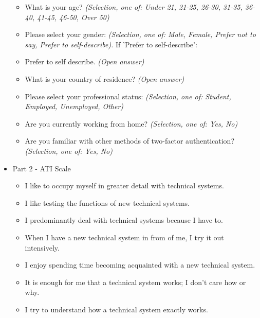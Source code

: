 \documentclass{l4proj}
\begin{document}
\begin{appendices}
\begin{itemize}
\begin{itemize}
        \item What is your age? \textit{(Selection, one of: Under 21, 21-25, 26-30, 31-35, 36-40, 41-45, 46-50, Over 50)}

        \item Please select your gender: \textit{(Selection, one of: Male, Female, Prefer not to say, Prefer to self-describe).} If 'Prefer to self-describe':

        \item Prefer to self describe. \textit{(Open answer)}

        \item What is your country of residence? \textit{(Open answer)}

        \item Please select your professional status: \textit{(Selection, one of: Student, Employed, Unemployed, Other)}

        \item Are you currently working from home? \textit{(Selection, one of: Yes, No)}

        \item Are you familiar with other methods of two-factor authentication? \textit{(Selection, one of: Yes, No)}
    \end{itemize}
    \item Part 2 - ATI Scale
    \begin{itemize}
        \item I like to occupy myself in greater detail with technical systems.

        \item I like testing the functions of new technical systems.
        
        \item I predominantly deal with technical systems because I have to.
        
        \item When I have a new technical system in from of me, I try it out intensively.
        
        \item I enjoy spending time becoming acquainted with a new technical system.
        
        \item It is enough for me that a technical system works; I don't care how or why.
        
        \item I try to understand how a technical system exactly works.
        

\end{itemize}
\end{itemize}
\end{appendices}
\end{document}
